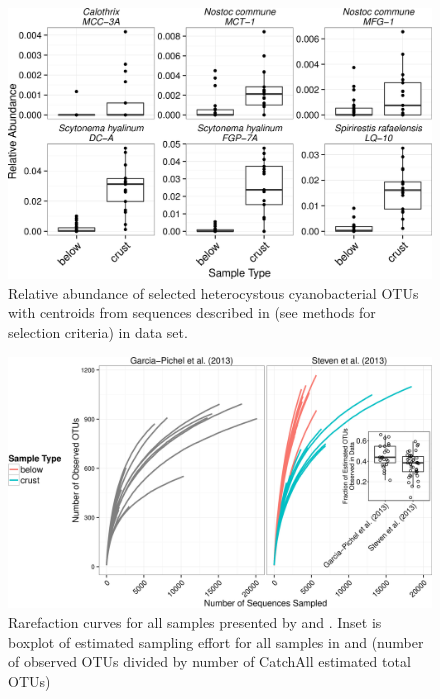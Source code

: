 \begin{figure}[h!]
  \centering
    \includegraphics[width=1.0\textwidth]{figures/het_cyano_steven2013/het_cyano_steven2013.png}
  \caption{Relative abundance of selected heterocystous cyanobacterial OTUs with centroids from sequences described in \citet{Yeager} (see methods for selection criteria) in \citet{Steven_2013} data set.}
  \label{fig:het_steven}
\end{figure}

\begin{figure}[h!]
  \centering
    \includegraphics[width=1.0\textwidth]{figures/rarefacation_curves1/raref_and_boxplot.png}
  \caption{Rarefaction curves for all samples presented by \citet{Garcia_Pichel_2013} and \citet{Steven_2013}. Inset is boxplot of estimated sampling effort for all samples in \citet{Garcia_Pichel_2013} and \citet{Steven_2013} (number of observed OTUs divided by number of CatchAll \cite{BUNGE_2010} estimated total OTUs)}
  \label{fig:rarefaction}
\end{figure}

